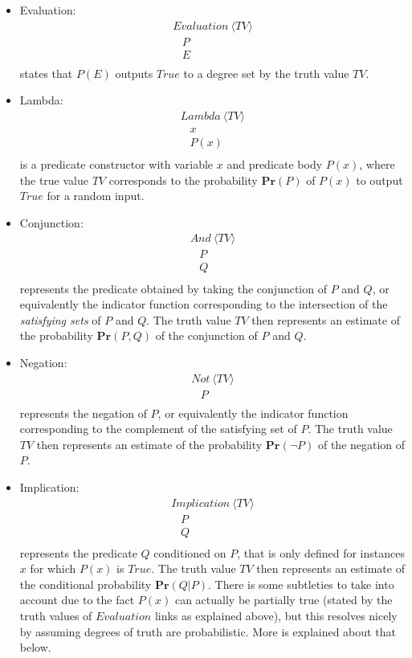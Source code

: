 \documentclass[runningheads]{llncs}
\newcommand{\SP}{\;\;\;}
\newcommand{\TTrue}{\textit{True}}
\newcommand{\TEval}{\textit{Evaluation}}
\newcommand{\TLamb}{\textit{Lambda}}
\newcommand{\TAnd}{\textit{And}}
\newcommand{\TNot}{\textit{Not}}
\newcommand{\TImpl}{\textit{Implication}}
\newcommand{\TTV}{\textit{TV}}
\newcommand{\TBTV}{\langle \TTV \rangle}
\newcommand{\MPr}{\mathbf{Pr}}
\begin{document}
\begin{itemize}
\item Evaluation:
  $$
  \begin{array}{l}
    \TEval\ \TBTV\\
    \SP P\\
    \SP E\\
  \end{array}
  $$
  states that $P(E)$ outputs $\TTrue$ to a degree set by the truth value
  $\TTV$.
\item Lambda:
  $$
  \begin{array}{l}
    \TLamb\ \TBTV\\
    \SP x\\
    \SP P(x)\\
  \end{array}
  $$
  is a predicate constructor with variable $x$ and predicate body
  $P(x)$, where the true value $\TTV$ corresponds to the probability
  $\MPr(P)$ of $P(x)$ to output $\TTrue$ for a random input.
\item Conjunction:
  $$
  \begin{array}{l}
    \TAnd\ \TBTV\\
    \SP P\\
    \SP Q\\
  \end{array}
  $$
  represents the predicate obtained by taking the conjunction of
  $P$ and $Q$, or equivalently the indicator function corresponding to
  the intersection of the \emph{satisfying sets} of $P$ and $Q$.
  The truth value $\TTV$ then represents an estimate of the
  probability $\MPr(P,Q)$ of the conjunction of $P$ and $Q$.
\item Negation:
  $$
  \begin{array}{l}
    \TNot\ \TBTV\\
    \SP P\\
  \end{array}
  $$
  represents the negation of $P$, or equivalently the indicator
  function corresponding to the complement of the satisfying set of
  $P$. The truth value $\TTV$ then represents an estimate of
  the probability $\MPr(\neg P)$ of the negation of $P$.
\item Implication:
  $$
  \begin{array}{l}
    \TImpl\ \TBTV\\
    \SP P\\
    \SP Q\\
  \end{array}
  $$
  represents the predicate $Q$ conditioned on $P$, that is only
  defined for instances $x$ for which $P(x)$ is $\TTrue$.  The truth
  value $\TTV$ then represents an estimate of the conditional
  probability $\MPr(Q|P)$.  There is some subtleties to take
  into account due to the fact $P(x)$ can actually be partially true
  (stated by the truth values of $\TEval$ links as explained above),
  but this resolves nicely by assuming degrees of truth are
  probabilistic.  More is explained about that below.
\end{itemize}
\end{document}
